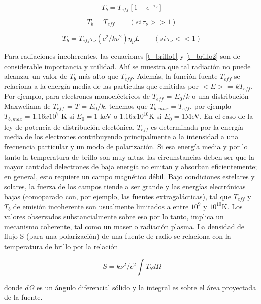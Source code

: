 \begin{equation} \label{t_brillo1}
T_b = T_{eff}[1-e^{-\tau_\nu}]
\end{equation}

\begin{equation} \label{t_brillo2}
T_b = T_{eff} \qquad (si \, \tau_\nu >> 1)
\end{equation}

\begin{equation} \label{t_brillo3}
T_b = T_{eff} \tau_\nu (c^2/k\nu^2)\eta_ \nu L \qquad (si \, \tau_\nu << 1)
\end{equation}

Para radiaciones incoherentes, las ecuaciones \ref{t_brillo1} y \ref{t_brillo2} son de considerable importancia y utilidad. Ah\'i se muestra que tal radiaci\'on no puede alcanzar un valor de $T_b$ m\'as alto que $T_{eff}$. Adem\'as, la funci\'on fuente $T_{eff}$ se relaciona a la energ\'ia media de las part\'iculas que emitidas por $<E>$ = $kT_{eff}$. Por ejemplo, para electrones monoel\'ectricos de $T_{eff}$ = $E_0/k$ o una distribuci\'on Maxweliana de $T_{eff}$ = $T$ = $E_0/k$, tenemos que $T_{b,max} = T_{eff}$, por ejemplo $T_{b,max} = 1.16 x 10^7$ K si $E_0 = 1$ keV o $1.16 x 10 ^{10}$K si $E_0 = 1$MeV. En el caso de la ley de potencia de distribuci\'on elect\'onica, $T_{eff}$ es determinada por la energ\'ia media de los electrones contribuyendo principalmente a la intensidad a una frecuencia particular y un modo de polarizaci\'on. Si esa energ\'ia media y por lo tanto la temperatura de brillo son muy altas, las circunstancias  deben ser que la mayor cantidad delectrones de baja energ\'ia no emitan y absorban eficientemente; en general, esto requiere un campo magn\'etico d\'ebil. Bajo condiciones estelares y solares, la fuerza de los campos tiende a ser grande y las energ\'ias electr\'onicas bajas (comoparado con, por ejemplo, las fuentes extragal\'acticas), tal que $T_{eff}$ y $T_b$ de emisi\'on incoherente son usualmente limitados a entre $10^9$ y $10^{10}$K. Los valores observados substancialmente sobre eso por lo tanto, implica un mecanismo coherente, tal como un maser o radiaci\'on plasma.
La densidad de flujo S (para una polarizaci\'on) de una fuente de radio se relaciona con la temperatura de brillo por la relaci\'on

\begin{equation} \label{densidad_flujo}
S = k\nu^2/c^2 \int T_b d\Omega
\end{equation}

donde $d\Omega$ es un \'angulo diferencial s\'olido y la integral es sobre el \'area proyectada de la fuente.

